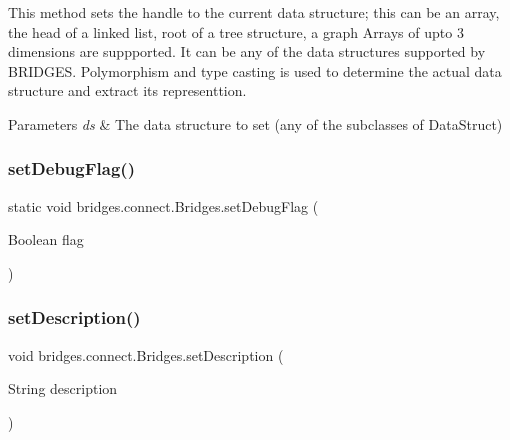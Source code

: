 This method sets the handle to the current data structure; this can be an array, the head of a linked list, root of a tree structure, a graph Arrays of upto 3 dimensions are suppported. It can be any of the data structures supported by B\+R\+I\+D\+G\+ES. Polymorphism and type casting is used to determine the actual data structure and extract its representtion.


\begin{DoxyParams}{Parameters}
{\em ds} & The data structure to set (any of the subclasses of Data\+Struct) \\
\hline
\end{DoxyParams}
\mbox{\label{classbridges_1_1connect_1_1_bridges_a9295b15aa880aa976706ed4f3337fb3b}} 
\subsubsection{\texorpdfstring{set\+Debug\+Flag()}{setDebugFlag()}}
{\footnotesize\ttfamily static void bridges.\+connect.\+Bridges.\+set\+Debug\+Flag (\begin{DoxyParamCaption}\item[{Boolean}]{flag }\end{DoxyParamCaption})\hspace{0.3cm}{\ttfamily [static]}}

\mbox{\label{classbridges_1_1connect_1_1_bridges_a50d1d5aa64d312393b63d1be854e34a2}} 
\subsubsection{\texorpdfstring{set\+Description()}{setDescription()}}
{\footnotesize\ttfamily void bridges.\+connect.\+Bridges.\+set\+Description (\begin{DoxyParamCaption}\item[{String}]{description }\end{DoxyParamCaption})}


